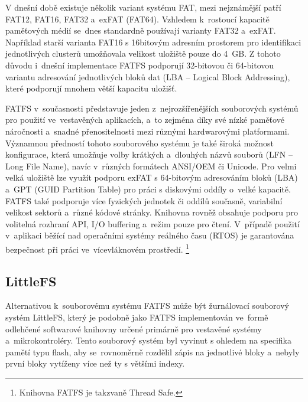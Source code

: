 V dnešní době existuje několik variant systému FAT, mezi nejznámější patří FAT12, FAT16, FAT32 a~exFAT (FAT64). Vzhledem k~rostoucí kapacitě paměťových médií se~dnes standardně používají varianty FAT32 a~exFAT. Například starší varianta FAT16 s 16bitovým adresním prostorem pro identifikaci jednotlivých clusterů umožňovala velikost uložiště pouze do 4~GB. Z tohoto důvodu i~dnešní implementace FATFS podporují 32-bitovou či 64-bitovou variantu adresování jednotlivých bloků dat (LBA -- Logical Block Addressing), které podporují mnohem větší kapacitu uložišť.~\cite{elm_fat_filesystem_app_note}

FATFS v~současnosti představuje jeden z~nejrozšířenějších souborových systémů pro použití ve~vestavěných aplikacích, a~to zejména díky své nízké paměťové náročnosti a~snadné přenositelnosti mezi různými hardwarovými platformami. Významnou předností tohoto souborového systému je také široká možnost konfigurace, která umožňuje volby krátkých a~dlouhých názvů souborů (LFN -- Long File Name), navíc v~různých formátech ANSI/OEM či Unicode. Pro velmi velká uložiště lze využít podporu exFAT s 64-bitovým adresováním bloků (LBA) a~GPT (GUID Partition Table) pro práci s diskovými oddíly o~velké kapacitě. FATFS také podporuje více fyzických jednotek či oddílů současně, variabilní velikost sektorů a~různé kódové stránky. Knihovna rovněž obsahuje podporu pro volitelná rozhraní API, I/O buffering a~režim pouze pro čtení. V~případě použití v~aplikaci běžící nad operačními systémy reálného času (RTOS) je garantována bezpečnost při práci ve~vícevláknovém prostředí. \footnote{Knihovna FATFS je takzvaně Thread Safe.}~\cite{elm_fat_filesystem_module}


\subsection{LittleFS}
\label{littlefs}
Alternativou k~souborovému systému FATFS může být žurnálovací souborový systém LittleFS, který je podobně jako FATFS implementován ve~formě odlehčené softwarové knihovny určené primárně pro vestavěné systémy a~mikrokontroléry.  Tento souborový systém byl vyvinut s ohledem na specifika pamětí typu flash, aby se~rovnoměrně rozdělil zápis na jednotlivé bloky a~nebyly první bloky vytíženy více než ty s většími indexy.~\cite{nxp_the_design_of_the_little_filesystem}

